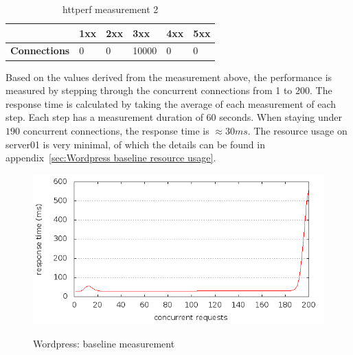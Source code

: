 \documentclass[Experiments]{subfiles}
\begin{document}
\begin{table}[H]
\caption{httperf measurement 2}
\begin{tabular}{|p{2cm}|p{}|p{}|p{}|p{}|p{}|}
\hline
 & \textbf{1xx} & \textbf{2xx} & \textbf{3xx} & \textbf{4xx} & \textbf{5xx} \\ \hline
\textbf{Connections} & 0 & 0 & 10000 & 0 & 0 \\ \hline
\end{tabular}
\label{fig:Baseline measurement 2}
\end{table}

Based on the values derived from the measurement above, the performance is measured by stepping through the concurrent connections from 1 to 200. The response time is calculated by taking the average of each measurement of  each step. Each step has a measurement duration of 60 seconds. When staying under $190$ concurrent connections, the response time is \mbox{$\approx 30 ms$}. The resource usage on server01 is very minimal, of which the details can be found in appendix~\ref{sec:Wordpress baseline resource usage}.

\begin{figure}[H]
\caption{Wordpress: baseline measurement}
\centering
\includegraphics[scale=0.55] {images/results/baseline_wp/output.png}
\label{fig:Baseline performance measurement}
\end{figure}
\end{document}
